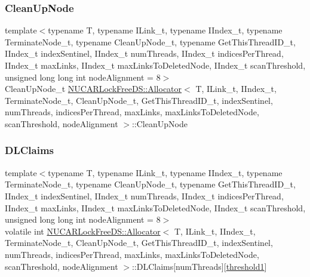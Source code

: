 \subsubsection{\texorpdfstring{Clean\+Up\+Node}{CleanUpNode}}
{\footnotesize\ttfamily template$<$typename T, typename I\+Link\+\_\+t, typename I\+Index\+\_\+t, typename Terminate\+Node\+\_\+t, typename Clean\+Up\+Node\+\_\+t, typename Get\+This\+Thread\+I\+D\+\_\+t, I\+Index\+\_\+t index\+Sentinel, I\+Index\+\_\+t num\+Threads, I\+Index\+\_\+t indices\+Per\+Thread, I\+Index\+\_\+t max\+Links, I\+Index\+\_\+t max\+Links\+To\+Deleted\+Node, I\+Index\+\_\+t scan\+Threshold, unsigned long long int node\+Alignment = 8$>$ \\
Clean\+Up\+Node\+\_\+t \mbox{\hyperlink{class_n_u_c_a_r_lock_free_d_s_1_1_allocator}{N\+U\+C\+A\+R\+Lock\+Free\+D\+S\+::\+Allocator}}$<$ T, I\+Link\+\_\+t, I\+Index\+\_\+t, Terminate\+Node\+\_\+t, Clean\+Up\+Node\+\_\+t, Get\+This\+Thread\+I\+D\+\_\+t, index\+Sentinel, num\+Threads, indices\+Per\+Thread, max\+Links, max\+Links\+To\+Deleted\+Node, scan\+Threshold, node\+Alignment $>$\+::Clean\+Up\+Node\hspace{0.3cm}{\ttfamily [private]}}

\mbox{\label{class_n_u_c_a_r_lock_free_d_s_1_1_allocator_aa50f17cb2e163dbd88a3fcb492b1dde2}} 
\subsubsection{\texorpdfstring{D\+L\+Claims}{DLClaims}}
{\footnotesize\ttfamily template$<$typename T, typename I\+Link\+\_\+t, typename I\+Index\+\_\+t, typename Terminate\+Node\+\_\+t, typename Clean\+Up\+Node\+\_\+t, typename Get\+This\+Thread\+I\+D\+\_\+t, I\+Index\+\_\+t index\+Sentinel, I\+Index\+\_\+t num\+Threads, I\+Index\+\_\+t indices\+Per\+Thread, I\+Index\+\_\+t max\+Links, I\+Index\+\_\+t max\+Links\+To\+Deleted\+Node, I\+Index\+\_\+t scan\+Threshold, unsigned long long int node\+Alignment = 8$>$ \\
volatile int \mbox{\hyperlink{class_n_u_c_a_r_lock_free_d_s_1_1_allocator}{N\+U\+C\+A\+R\+Lock\+Free\+D\+S\+::\+Allocator}}$<$ T, I\+Link\+\_\+t, I\+Index\+\_\+t, Terminate\+Node\+\_\+t, Clean\+Up\+Node\+\_\+t, Get\+This\+Thread\+I\+D\+\_\+t, index\+Sentinel, num\+Threads, indices\+Per\+Thread, max\+Links, max\+Links\+To\+Deleted\+Node, scan\+Threshold, node\+Alignment $>$\+::D\+L\+Claims\mbox{[}num\+Threads\mbox{]}\mbox{[}\mbox{\hyperlink{class_n_u_c_a_r_lock_free_d_s_1_1_allocator_a1d220e1cc963fc9fb37e46a416504715}{threshold1}}\mbox{]}\hspace{0.3cm}{\ttfamily [private]}}

